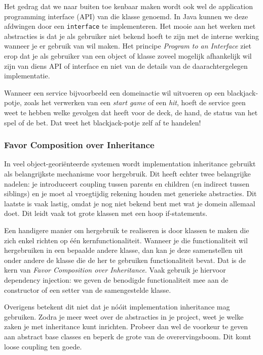 \documentclass[dutch,a4paper,12pt,doubleside]{book}
\begin{document}
Het gedrag dat we naar buiten toe kenbaar maken wordt ook wel de 
application programming interface (API) van die klasse genoemd.
In Java kunnen we deze afdwingen door een \texttt{interface} te implementeren.
Het mooie aan het werken met abstracties is dat je als gebruiker niet bekend hoeft 
te zijn met de interne werking wanneer je er gebruik van wil maken.
Het principe \textit{Program to an Interface} 
ziet erop dat je als gebruiker van een object of 
klasse zoveel mogelijk afhankelijk wil zijn van diens 
API of interface en niet van de details van 
de daarachtergelegen implementatie.

Wanneer een service bijvoorbeeld een domeinactie wil uitvoeren op een blackjack-potje, zoals het 
verwerken van een \textit{start game} of een \textit{hit}, 
hoeft de service geen weet te hebben welke gevolgen dat heeft voor 
de deck, de hand, de status van het spel of de bet. 
Dat weet het blackjack-potje zelf af te handelen!

\subsubsection{Favor Composition over Inheritance}
In veel object-georiënteerde systemen wordt implementation inheritance
gebruikt als belangrijkste mechanisme voor hergebruik. Dit heeft echter
twee belangrijke nadelen: je introduceert coupling tussen parents en children 
(en indirect tussen siblings) en je moet al vroegtijdig rekening houden met 
generieke abstracties. Dit laatste is vaak lastig, omdat je nog niet bekend 
bent met wat je domein allemaal doet. Dit leidt vaak tot grote klassen met 
een hoop if-statements.

Een handigere manier om hergebruik te realiseren is door klassen 
te maken die zich enkel richten op één kernfunctionaliteit.
Wanneer je die functionaliteit wil hergebruiken in een bepaalde
andere klasse, dan kan je deze samenstellen uit onder andere de klasse die 
de her te gebruiken functionaliteit bevat. Dat is de kern van 
\textit{Favor Composition over Inheritance}.
Vaak gebruik je hiervoor dependency injection:
we geven de benodigde functionaliteit mee aan de constructor of een setter
van de samengestelde klasse.

Overigens betekent dit niet dat je nóóit implementation inheritance mag gebruiken.
Zodra je meer weet over de abstracties in je project, weet je welke zaken je 
met inheritance kunt inrichten. Probeer dan wel de voorkeur te geven aan abstract base classes
en beperk de grote van de overervingsboom. Dit komt loose coupling ten goede.
\end{document}
